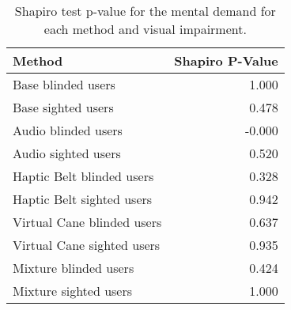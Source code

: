 
\begin{table}[!htb]
\centering
\caption{Shapiro test p-value for the mental demand for each method and visual impairment.}
\label{tab:shapiro_mental_demand}
\begin{tabular}{lr}
\toprule
                    Method &  Shapiro P-Value \\
\midrule
        Base blinded users &            1.000 \\
        Base sighted users &            0.478 \\
       Audio blinded users &           -0.000 \\
       Audio sighted users &            0.520 \\
 Haptic Belt blinded users &            0.328 \\
 Haptic Belt sighted users &            0.942 \\
Virtual Cane blinded users &            0.637 \\
Virtual Cane sighted users &            0.935 \\
     Mixture blinded users &            0.424 \\
     Mixture sighted users &            1.000 \\
\bottomrule
\end{tabular}
\end{table}

